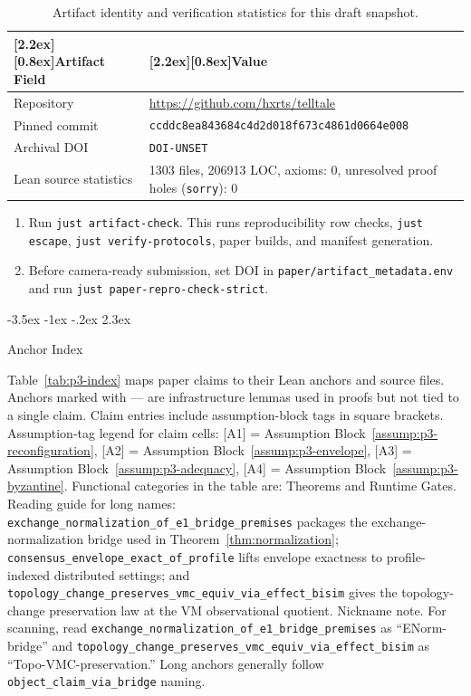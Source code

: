 \documentclass[a4paper,10pt,twocolumn,english]{article}
\makeatletter
\renewcommand{\section}{\@startsection{section}{1}{\z@}%
  {-3.5ex \@plus -1ex \@minus -.2ex}%
  {2.3ex}%
  {\raggedright\normalfont\large\bfseries}}
\numberwithin{equation}{section}
\theoremstyle{paperdef}
\theoremstyle{paperplain}
\theoremstyle{paperdef}
\theoremstyle{paperremark}
\theoremstyle{paperdef}
\newcommand{\thead}[1]{\textbf{\raisebox{0pt}[2.2ex][0.8ex]{#1}}}
\makeatother
\begin{document}
\begin{table}[H]
	\centering
	\footnotesize
	\begin{tabularx}{\columnwidth}{@{}L{0.34\columnwidth}L{0.61\columnwidth}@{}}
		\toprule
		\thead{Artifact Field} & \thead{Value}                                                                             \\
		\midrule
		Repository             & \url{https://github.com/hxrts/telltale}                                                   \\
		Pinned commit & \texttt{ccddc8ea843684c4}\allowbreak\texttt{d2d018f673c4861d}\allowbreak\texttt{0664e008} \\
		Archival DOI & \texttt{DOI-UNSET} \\
		Lean source statistics & 1303 files, 206913 LOC, axioms: 0, unresolved proof holes (\texttt{sorry}): 0 \\
		\bottomrule
	\end{tabularx}
	\caption{Artifact identity and verification statistics for this draft snapshot.}
\end{table}

\begin{enumerate}
	\item Run \texttt{just artifact-check}. This runs reproducibility row checks, \texttt{just escape}, \texttt{just verify-protocols}, paper builds, and manifest generation.
	\item Before camera-ready submission, set DOI in \texttt{paper/artifact\_metadata.env} and run \texttt{just paper-repro-check-strict}.
\end{enumerate}

\clearpage
\onecolumn

\section{Anchor Index}
\label{app:index}

Table~\ref{tab:p3-index} maps paper claims to their Lean anchors and source files. Anchors marked with --- are infrastructure lemmas used in proofs but not tied to a single claim. Claim entries include assumption-block tags in square brackets.
Assumption-tag legend for claim cells: [A1] = Assumption
Block~\ref{assump:p3-reconfiguration}, [A2] = Assumption
Block~\ref{assump:p3-envelope}, [A3] = Assumption
Block~\ref{assump:p3-adequacy}, [A4] = Assumption
Block~\ref{assump:p3-byzantine}.
Functional categories in the table are: Theorems and Runtime Gates. Reading
guide for long names:
\texttt{exchange\_normalization\_of\_e1\_bridge\_premises} packages the
exchange-normalization bridge used in Theorem~\ref{thm:normalization};
\texttt{consensus\_envelope\_exact\_of\_profile} lifts envelope exactness to
profile-indexed distributed settings; and
\texttt{topology\_change\_preserves\_vmc\_equiv\_via\_effect\_bisim} gives the
topology-change preservation law at the VM observational quotient.
Nickname note. For scanning, read
\texttt{exchange\_normalization\_of\_e1\_bridge\_premises} as
``ENorm-bridge'' and
\texttt{topology\_change\_preserves\_vmc\_equiv\_via\_effect\_bisim} as
``Topo-VMC-preservation.'' Long anchors generally follow
\texttt{object\_claim\_via\_bridge} naming.
\end{document}
